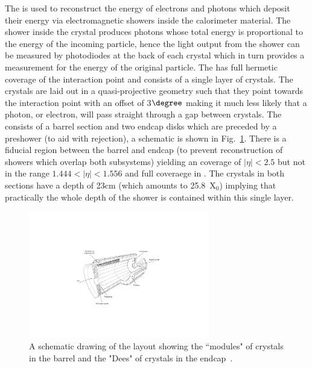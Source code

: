 The \ECAL is used to reconstruct the energy of electrons and photons which deposit their energy via electromagnetic showers inside the calorimeter material. The shower inside the crystal produces photons whose total energy is proportional to the energy of the incoming particle, hence the light output from the shower can be measured by photodiodes at the back of each crystal which in turn provides a measurement for the energy of the original particle. The \ECAL has full hermetic coverage of the interaction point and consists of a single layer of \PbWO crystals. The crystals are laid out in a quasi-projective geometry such that they point towards the interaction point with an offset of 3$\degree$ making it much less likely that a photon, or electron, will pass straight through a gap between crystals. The \ECAL consists of a barrel section and two endcap disks which are preceded by a preshower (to aid with \pizero rejection), a schematic is shown in Fig.~\ref{fig:cms_ecal}. There is a fiducial region between the barrel and endcap (to prevent reconstruction of showers which overlap both subsystems) yielding an \ECAL coverage of $|\eta|<2.5$ but not in the range $1.444<|\eta|<1.556$ and full coveraege in \phi. The crystals in both sections have a depth of 23cm (which amounts to 25.8~X$_{0}$) implying that practically the whole depth of the shower is contained within this single layer. 

\begin{figure}
  \includegraphics[width=0.7\textwidth]{ch2_cms_exp/plots/cmsecal.pdf}
  \caption[CMS ECAL schematic]{A schematic drawing of the \CMS \ECAL layout showing the ``modules" of crystals in the \ECAL barrel and the "Dees" of crystals in the \ECAL endcap~\cite{CMS_JINST}.}
  \label{fig:cms_ecal}
\end{figure}

